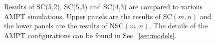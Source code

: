 \begin{figure}[h]
\begin{center}
        \caption{Results of  SC(5,2), SC(5,3) and SC(4,3) are compared to various AMPT simulations. Upper panels are the results of SC$(m,n)$ and the lower panels are the results of NSC$(m,n)$. The details of the AMPT configurations can be found in Sec.~\ref{sec:models}.}
        \label{fig:Figure_7}
        \end{center}   
 \end{figure}
 
